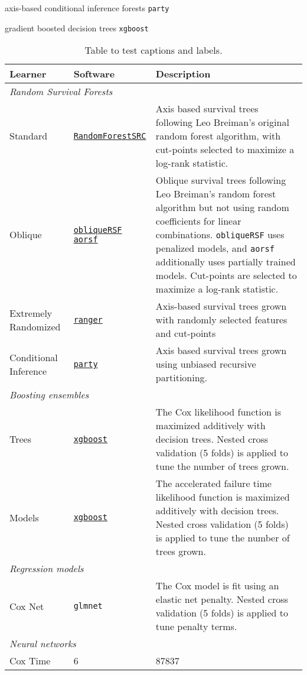 \documentclass[twoside,11pt]{article}\usepackage[]{graphicx}\usepackage[]{color}
\begin{document}
axis-based conditional inference forests \texttt{party}

gradient boosted decision trees \texttt{xgboost}


\begin{table}[h!]
\centering
\begin{tabular}{p{2cm} | p{3cm} p{7cm}}
 \hline
 Learner & Software & Description \\ [0.5ex]
 \hline\hline
 \multicolumn{3}{l}{\textit{Random Survival Forests}}\\
 \hline\hline
 Standard & \href{https://www.randomforestsrc.org/index.html}{\texttt{RandomForestSRC}} & Axis based survival trees following Leo Breiman's original random forest algorithm, with cut-points selected to maximize a log-rank statistic.  \\ \hline
 Oblique & \href{https://CRAN.R-project.org/package=obliqueRSF}{\texttt{obliqueRSF}} \newline \href{https://bcjaeger.github.io/aorsf/}{\texttt{aorsf}} & Oblique survival trees following Leo Breiman's random forest algorithm but not using random coefficients for linear combinations. \texttt{obliqueRSF} uses penalized models, and \texttt{aorsf} additionally uses partially trained models. Cut-points are selected to maximize a log-rank statistic. \\ \hline
 Extremely \,Randomized & \href{https://CRAN.R-project.org/package=ranger}{\texttt{ranger}} & Axis-based survival trees grown with randomly selected features and cut-points\\ \hline
 Conditional \,Inference & \href{http://party.r-forge.r-project.org/}{\texttt{party}} & Axis based survival trees grown using unbiased recursive partitioning.  \\
 \hline\hline
 \multicolumn{3}{l}{\textit{Boosting ensembles}}\\
 \hline\hline
 Trees & \href{https://xgboost.readthedocs.io/en/stable/#}{\texttt{xgboost}} & The Cox likelihood function is maximized additively with decision trees. Nested cross validation (5 folds) is applied to tune the number of trees grown.  \\
 Models & \href{https://xgboost.readthedocs.io/en/stable/#}{\texttt{xgboost}} & The accelerated failure time likelihood function is maximized additively with decision trees. Nested cross validation (5 folds) is applied to tune the number of trees grown.  \\
 \hline\hline
 \multicolumn{3}{l}{\textit{Regression models}}\\
 \hline\hline
 Cox Net & \texttt{glmnet} & The Cox model is fit using an elastic net penalty. Nested cross validation (5 folds) is applied to tune penalty terms.\\
 \hline\hline
 \multicolumn{3}{l}{\textit{Neural networks}}\\
 \hline\hline
 Cox Time & 6 & 87837  \\
 \hline
\end{tabular}
\caption{Table to test captions and labels.}
\label{table:1}
\end{table}
\end{document}

